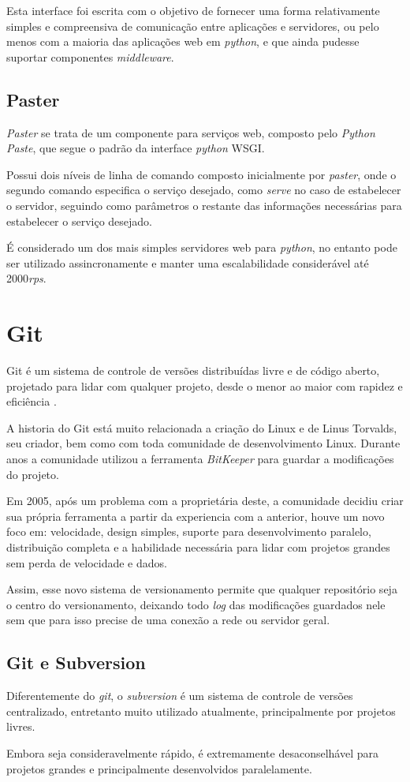 Esta interface foi escrita com o objetivo de fornecer uma forma relativamente simples e compreensiva de comunicação entre aplicações e servidores, ou pelo menos com a maioria das aplicações web em \textit{python}, e que ainda pudesse suportar componentes \textit{middleware}.


\subsection{Paster}

\textit{Paster} se trata de um componente para serviços web, composto pelo \textit{Python Paste}, que segue o padrão da interface \textit{python} WSGI.

Possui dois níveis de linha de comando composto inicialmente por \textit{paster}, onde o segundo comando especifica o serviço desejado, como \textit{serve} no caso de estabelecer o servidor, seguindo como parâmetros o restante das informações necessárias para estabelecer o serviço desejado.

É considerado um dos mais simples servidores web para \textit{python}, no entanto pode ser utilizado assincronamente e manter uma escalabilidade considerável até 2000\textit{rps}.


\section{Git}

Git é um sistema de controle de versões distribuídas livre e de código aberto, projetado para lidar com qualquer projeto, desde o menor ao maior com rapidez e eficiência \cite{SOFTWARE-FREEDOM-CONSERVANCY}.

A historia do Git está muito relacionada a criação do Linux e de Linus Torvalds, seu criador, bem como com toda comunidade de desenvolvimento Linux. Durante anos a comunidade utilizou a ferramenta \textit{BitKeeper} para guardar a modificações do projeto.

Em 2005, após um problema com a proprietária deste, a comunidade decidiu criar sua própria ferramenta a partir da experiencia com a anterior, houve um novo foco em: velocidade, design simples, suporte para desenvolvimento paralelo, distribuição completa e a habilidade necessária para lidar com projetos grandes sem perda de velocidade e dados.

Assim, esse novo sistema de versionamento permite que qualquer repositório seja o centro do versionamento, deixando todo \textit{log} das modificações guardados nele sem que para isso precise de uma conexão a rede ou servidor geral.


\subsection{Git e Subversion}

Diferentemente do \textit{git}, o \textit{subversion} é um sistema de controle de versões centralizado, entretanto muito utilizado atualmente, principalmente por projetos livres.

Embora seja consideravelmente rápido, é extremamente desaconselhável para projetos grandes e principalmente desenvolvidos paralelamente.
